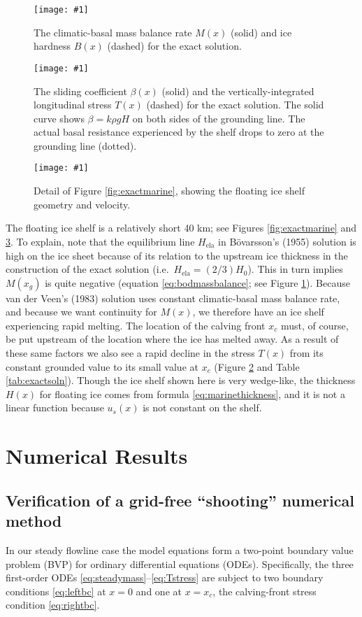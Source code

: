 \documentclass[twocolumn]{igs}
\renewcommand{\dh}{\fontencoding{T1}\selectfont{\symbol{240}}}
\newcommand{\onecol}[1]{\texttt{[image: \#1]}}
\newcommand{\bod}{B\"o\dh varsson\xspace}
\newcommand{\Hela}{H_{\text{ela}}}
\begin{document}
\begin{figure}[ht]
\onecol{em-M-B}
\caption{The climatic-basal mass balance rate $M(x)$ (solid) and ice hardness $B(x)$ (dashed) for the exact solution.} \label{fig:exactMB}
\end{figure}

\begin{figure}[ht]
\onecol{em-beta-T}
\caption{The sliding coefficient $\beta(x)$ (solid) and the vertically-integrated longitudinal stress $T(x)$ (dashed) for the exact solution.  The solid curve shows $\beta = k \rho g H$ on both sides of the grounding line.  The actual basal resistance experienced by the shelf drops to zero at the grounding line (dotted).} \label{fig:exactbetaT}
\end{figure}

\begin{figure}[ht]
\onecol{em-geometry-detail}
\caption{Detail of Figure \ref{fig:exactmarine}, showing the floating ice shelf geometry and velocity.} \label{fig:em-detail}
\end{figure}

The floating ice shelf is a relatively short 40 km; see Figures \ref{fig:exactmarine} and \ref{fig:em-detail}.  To explain, note that the equilibrium line $\Hela$ in \bod's (1955) solution is high on the ice sheet because of its relation to the upstream ice thickness in the construction of the exact solution (i.e.~$\Hela = (2/3) H_0$).  This in turn implies $M(x_g)$ is quite negative (equation \eqref{eq:bodmassbalance}; see Figure \ref{fig:exactMB}).  Because van der Veen's (1983) solution uses constant climatic-basal mass balance rate, and because we want continuity for $M(x)$, we therefore have an ice shelf experiencing rapid melting.  The location of the calving front $x_c$ must, of course, be put upstream of the location where the ice has melted away.  As a result of these same factors we also see a rapid decline in the stress $T(x)$ from its constant grounded value to its small value at $x_c$ (Figure \ref{fig:exactbetaT} and Table \ref{tab:exactsoln}).  Though the ice shelf shown here is very wedge-like, the thickness $H(x)$ for floating ice comes from formula \eqref{eq:marinethickness}, and it is not a linear function because $u_s(x)$ is not constant on the shelf.


\section{Numerical Results}

\subsection*{Verification of a grid-free ``shooting'' numerical method}  In our steady flowline case the model equations form a two-point boundary value problem (BVP) for ordinary differential equations (ODEs).  Specifically, the three first-order ODEs \eqref{eq:steadymass}--\eqref{eq:Tstress} are subject to two boundary conditions \eqref{eq:leftbc} at $x=0$ and one at $x=x_c$, the calving-front stress condition \eqref{eq:rightbc}.  
\end{document}
